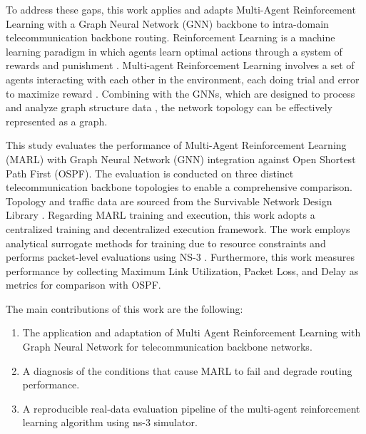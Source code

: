 To address these gaps, this work applies and adapts Multi-Agent Reinforcement Learning with a Graph Neural Network (GNN) backbone to intra-domain telecommunication backbone routing. Reinforcement Learning is a machine learning paradigm in which agents learn optimal actions through a system of rewards and punishment \cite{SHAKARAMI2020107496}. Multi-agent Reinforcement Learning involves a set of agents interacting with each other in the environment, each doing trial and error to maximize reward \cite{marl-book}. Combining with the GNNs, which are designed to process and analyze graph structure data \cite{10960451}, the network topology can be effectively represented as a graph.

This study evaluates the performance of Multi-Agent Reinforcement Learning (MARL) with Graph Neural Network (GNN) integration against Open Shortest Path First (OSPF). The evaluation is conducted on three distinct telecommunication backbone topologies to enable a comprehensive comparison. Topology and traffic data are sourced from the Survivable Network Design Library \cite{SNDlib10} \cite{OrlowskiPioroTomaszewskiWessaely2010}. Regarding MARL training and execution, this work adopts a centralized training and decentralized execution framework. The work employs analytical surrogate methods for training due to resource constraints and performs packet-level evaluations using NS-3 \cite{Riley2010}. Furthermore, this work measures performance by collecting Maximum Link Utilization, Packet Loss, and Delay as metrics for comparison with OSPF.  

The main contributions of this work are the following:
\begin{enumerate}
\item The application and adaptation of Multi Agent Reinforcement Learning with Graph Neural Network for telecommunication backbone networks. 
\item A diagnosis of the conditions that cause MARL to fail and degrade routing performance.
\item A reproducible real-data evaluation pipeline of the multi-agent reinforcement learning algorithm using ns-3 simulator.
\end{enumerate}

